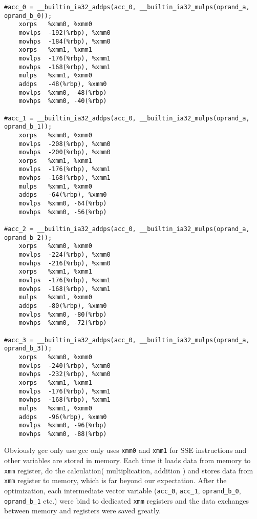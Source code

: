 \documentclass[12pt]{article}
\begin{document}
\scriptsize
\begin{verbatim}
#acc_0 = __builtin_ia32_addps(acc_0, __builtin_ia32_mulps(oprand_a, oprand_b_0));
	xorps	%xmm0, %xmm0
	movlps	-192(%rbp), %xmm0
	movhps	-184(%rbp), %xmm0
	xorps	%xmm1, %xmm1
	movlps	-176(%rbp), %xmm1
	movhps	-168(%rbp), %xmm1
	mulps	%xmm1, %xmm0
	addps	-48(%rbp), %xmm0
	movlps	%xmm0, -48(%rbp)
	movhps	%xmm0, -40(%rbp)

#acc_1 = __builtin_ia32_addps(acc_0, __builtin_ia32_mulps(oprand_a, oprand_b_1));
	xorps	%xmm0, %xmm0
	movlps	-208(%rbp), %xmm0
	movhps	-200(%rbp), %xmm0
	xorps	%xmm1, %xmm1
	movlps	-176(%rbp), %xmm1
	movhps	-168(%rbp), %xmm1
	mulps	%xmm1, %xmm0
	addps	-64(%rbp), %xmm0
	movlps	%xmm0, -64(%rbp)
	movhps	%xmm0, -56(%rbp)

#acc_2 = __builtin_ia32_addps(acc_0, __builtin_ia32_mulps(oprand_a, oprand_b_2));
	xorps	%xmm0, %xmm0
	movlps	-224(%rbp), %xmm0
	movhps	-216(%rbp), %xmm0
	xorps	%xmm1, %xmm1
	movlps	-176(%rbp), %xmm1
	movhps	-168(%rbp), %xmm1
	mulps	%xmm1, %xmm0
	addps	-80(%rbp), %xmm0
	movlps	%xmm0, -80(%rbp)
	movhps	%xmm0, -72(%rbp)

#acc_3 = __builtin_ia32_addps(acc_0, __builtin_ia32_mulps(oprand_a, oprand_b_3));
	xorps	%xmm0, %xmm0
	movlps	-240(%rbp), %xmm0
	movhps	-232(%rbp), %xmm0
	xorps	%xmm1, %xmm1
	movlps	-176(%rbp), %xmm1
	movhps	-168(%rbp), %xmm1
	mulps	%xmm1, %xmm0
	addps	-96(%rbp), %xmm0
	movlps	%xmm0, -96(%rbp)
	movhps	%xmm0, -88(%rbp)
\end{verbatim}
\normalsize

Obviously gcc only use gcc only uses \texttt{xmm0} and \texttt{xmm1}
for SSE instructions and other variables are stored in memory. Each
time it loads data from memory to \texttt{xmm} register, do the 
calculation( multiplication, addition ) and stores data from 
\texttt{xmm} register to memory, which is far beyond our expectation.
After the optimization, each intermediate vector variable 
(\texttt{acc\_0}, \texttt{acc\_1}, \texttt{oprand\_b\_0}, 
\texttt{oprand\_b\_1} etc.) were bind to dedicated \texttt{xmm} 
registers and the data exchanges between memory and registers 
were saved greatly.
\end{document}
